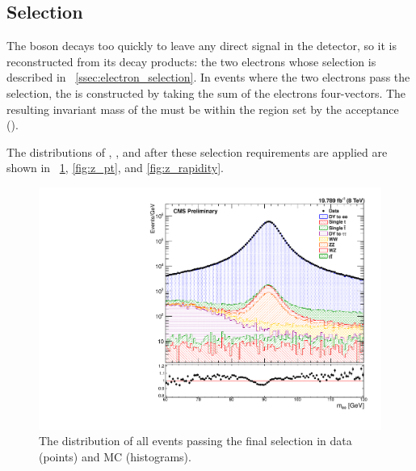 \subsection{\Z Selection}

The \Z boson decays too quickly to leave any direct signal in the detector, so
it is reconstructed from its decay products: the two electrons whose selection
is described in \SEC~\ref{ssec:electron_selection}. In events where the two
electrons pass the selection, the \Z is constructed by taking the sum of the
electrons four-vectors. The resulting invariant mass of the \Z must be within
the region set by the acceptance (\MassRange).

The distributions of \mee, \Z \pt, and \Z \rapidity after these selection
requirements are applied are shown in \FIGS~\ref{fig:z_mass}, \ref{fig:z_pt},
and \ref{fig:z_rapidity}.

\begin{figure}[!htbp]
    \centering
    \includegraphics[width=\textwidth]{figures/z_mass_fine.pdf}
    \caption{
        The \mee distribution of all events passing the final selection in data
        (points) and MC (histograms).
    }
    \label{fig:z_mass}
\end{figure}

